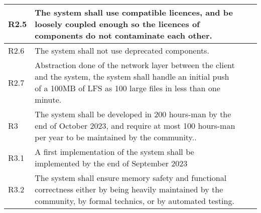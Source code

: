 \begin{landscape}
\begin{longtable}{|p{1cm}|p{19cm}|p{2cm}|p{3cm}|}
        \rowcolor[HTML]{DDFFDD}        R2.5       & The system shall use compatible licences, and be loosely coupled enough so the licences of components do not contaminate each other.                                                                                                                                                  &                       &                                          \\ \hline
        \rowcolor[HTML]{DDFFDD}        R2.6       & The system shall not use deprecated components.                                                                                                                                                                                                                                       &                       &                                          \\ \hline
        \rowcolor[HTML]{DDFFDD}        R2.7       & Abstraction done of the network layer between the client and the system, the system shall handle an initial push of a 100MB of LFS as 100 large files in less than one minute.                                                                                                        &                       &                                          \\ \hline
        \rowcolor[HTML]{C0C0C0}        R3         & The system shall be developed in 200 hours-man by the end of October 2023, and require at most 100 hours-man per year to be maintained by the community..                                                                                                                             &                       &                                          \\ \hline
        \rowcolor[HTML]{FFDDDD}        R3.1       & A first implementation of the system shall be implemented by the end of September 2023                                                                                                                                                                                                &                       &                                          \\ \hline
        \rowcolor[HTML]{DDFFDD}        R3.2       & The system shall ensure memory safety and functional correctness either by being heavily maintained by the community, by formal technics, or by automated testing.                                                                                                                    &                       &                                          \\ \hline

\end{longtable}
\end{landscape}
